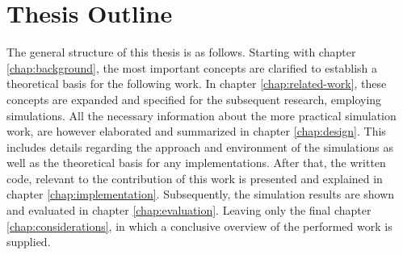\section{Thesis Outline}
The general structure of this thesis is as follows. Starting with chapter \ref{chap:background}, the most important concepts are clarified to establish a theoretical basis for the following work. In chapter \ref{chap:related-work}, these concepts are expanded and specified for the subsequent research, employing simulations. All the necessary information about the more practical simulation work, are however elaborated and summarized in chapter \ref{chap:design}. This includes details regarding the approach and environment of the simulations as well as the theoretical basis for any implementations. After that, the written code, relevant to the contribution of this work is presented and explained in chapter \ref{chap:implementation}. Subsequently, the simulation results are shown and evaluated in chapter \ref{chap:evaluation}. Leaving only the final chapter \ref{chap:considerations}, in which a conclusive overview of the performed work is supplied.
